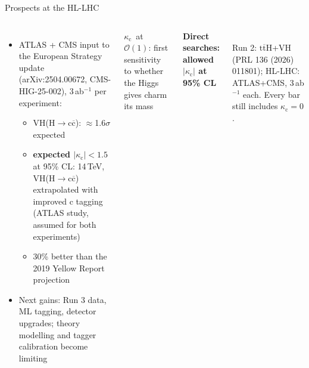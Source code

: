 \documentclass[aspectratio=169,10pt,xcolor=table]{beamer}
\newcommand{\qbar}[1]{\mathrm{#1}\overline{\mathrm{#1}}}
\newcommand{\kc}{\ensuremath{\kappa_\mathrm{c}}}
\newcommand{\Hcc}{\ensuremath{\mathrm{H}\to\qbar{c}}}
\newcommand{\ttH}{\ensuremath{\qbar{t}\mathrm{H}}}
\begin{document}
\begin{frame}{Prospects at the HL-LHC}
  \begin{columns}[T]
    \begin{itemize}\small
      \item ATLAS + CMS input to the European Strategy update\\
        {\scriptsize (arXiv:2504.00672, CMS-HIG-25-002), 3\,ab$^{-1}$ per experiment:}
      \begin{itemize}
        \item VH(\Hcc): $\approx$1.6$\sigma$ expected
        \item \textbf{expected $|\kc| < 1.5$} at 95\% CL: 14\,TeV, VH(\Hcc) extrapolated with improved c tagging (ATLAS study, assumed for both experiments)
        \item 30\% better than the 2019 Yellow Report projection
      \end{itemize}
      \item Next gains: Run 3 data, ML tagging, detector upgrades; theory modelling and tagger calibration become limiting
    \end{itemize}
    \begin{block}{}
      \centering\small \kc\ at $\mathcal{O}(1)$: first sensitivity to whether the Higgs gives charm its mass
    \end{block}
    \centering
    {\small\bfseries\color{cmsblue}Direct searches: allowed $|\kc|$ at 95\% CL}\\[0.6ex]
    \\[0.3ex]
    {\scriptsize Run 2: \ttH+VH (PRL 136 (2026) 011801); HL-LHC: ATLAS+CMS, 3\,ab$^{-1}$ each. Every bar still includes $\kc=0$.}
  \end{columns}
\end{frame}
\end{document}

